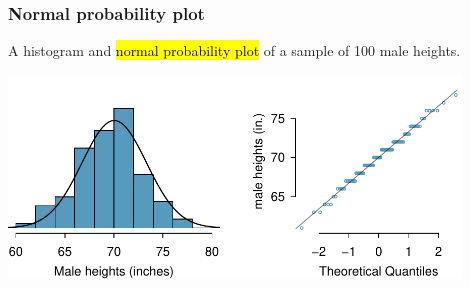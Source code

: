 \documentclass[11pt,containsverbatim,handout,xcolor=xelatex,dvipsnames,table]{beamer}
\begin{document}


\begin{frame}
\frametitle{Normal probability plot}

A histogram and \hl{normal probability plot} of a sample of 100 male heights.

\begin{center}
\includegraphics[width=0.9\textwidth]{figures/fcidMHeights/fcidMHeights}
\end{center}


\end{frame}


%
%
%
%
%
%
%
%
%
%
%
%
%
%
\end{document}
